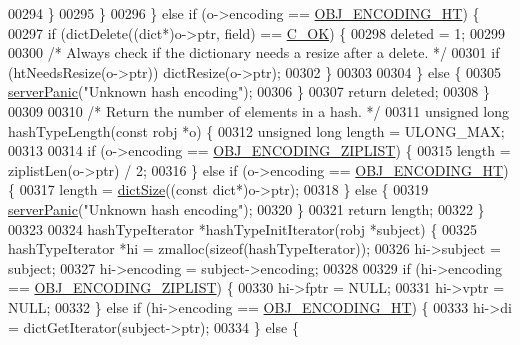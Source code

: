 \begin{DoxyCode}
00294             \}
00295         \}
00296     \} \textcolor{keywordflow}{else} \textcolor{keywordflow}{if} (o->encoding == \hyperlink{server_8h_a9c10219f68afc557d510d108257d238b}{OBJ\_ENCODING\_HT}) \{
00297         \textcolor{keywordflow}{if} (dictDelete((dict*)o->ptr, field) == \hyperlink{server_8h_a303769ef1065076e68731584e758d3e1}{C\_OK}) \{
00298             deleted = 1;
00299 
00300             \textcolor{comment}{/* Always check if the dictionary needs a resize after a delete. */}
00301             \textcolor{keywordflow}{if} (htNeedsResize(o->ptr)) dictResize(o->ptr);
00302         \}
00303 
00304     \} \textcolor{keywordflow}{else} \{
00305         \hyperlink{server_8h_a11cc378e7778a830b41240578de3b204}{serverPanic}(\textcolor{stringliteral}{"Unknown hash encoding"});
00306     \}
00307     \textcolor{keywordflow}{return} deleted;
00308 \}
00309 
00310 \textcolor{comment}{/* Return the number of elements in a hash. */}
00311 \textcolor{keywordtype}{unsigned} \textcolor{keywordtype}{long} hashTypeLength(\textcolor{keyword}{const} robj *o) \{
00312     \textcolor{keywordtype}{unsigned} \textcolor{keywordtype}{long} length = ULONG\_MAX;
00313 
00314     \textcolor{keywordflow}{if} (o->encoding == \hyperlink{server_8h_aabf064ede983103f1fd0df2086e84eee}{OBJ\_ENCODING\_ZIPLIST}) \{
00315         length = ziplistLen(o->ptr) / 2;
00316     \} \textcolor{keywordflow}{else} \textcolor{keywordflow}{if} (o->encoding == \hyperlink{server_8h_a9c10219f68afc557d510d108257d238b}{OBJ\_ENCODING\_HT}) \{
00317         length = \hyperlink{dict_8h_af193430dd3d5579a52b194512f72c1f0}{dictSize}((\textcolor{keyword}{const} dict*)o->ptr);
00318     \} \textcolor{keywordflow}{else} \{
00319         \hyperlink{server_8h_a11cc378e7778a830b41240578de3b204}{serverPanic}(\textcolor{stringliteral}{"Unknown hash encoding"});
00320     \}
00321     \textcolor{keywordflow}{return} length;
00322 \}
00323 
00324 hashTypeIterator *hashTypeInitIterator(robj *subject) \{
00325     hashTypeIterator *hi = zmalloc(\textcolor{keyword}{sizeof}(hashTypeIterator));
00326     hi->subject = subject;
00327     hi->encoding = subject->encoding;
00328 
00329     \textcolor{keywordflow}{if} (hi->encoding == \hyperlink{server_8h_aabf064ede983103f1fd0df2086e84eee}{OBJ\_ENCODING\_ZIPLIST}) \{
00330         hi->fptr = NULL;
00331         hi->vptr = NULL;
00332     \} \textcolor{keywordflow}{else} \textcolor{keywordflow}{if} (hi->encoding == \hyperlink{server_8h_a9c10219f68afc557d510d108257d238b}{OBJ\_ENCODING\_HT}) \{
00333         hi->di = dictGetIterator(subject->ptr);
00334     \} \textcolor{keywordflow}{else} \{

\end{DoxyCode}
